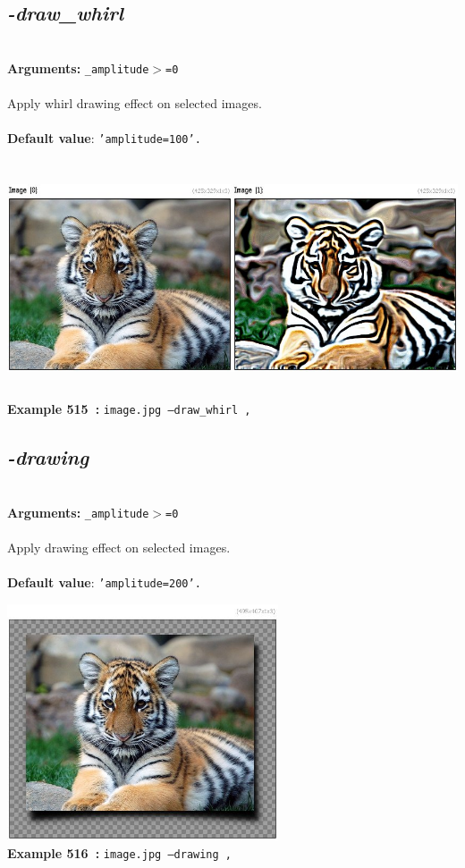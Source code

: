 \documentclass[a4paper,11pt,twoside]{book}
\begin{document}
\subsection{\emph{-draw\_whirl} }\vspace*{-0.5em}
~\\\textbf{Arguments: } 
{\small \texttt{\_amplitude$>$=0}}\\~\\
Apply whirl drawing effect on selected images.
~\\~\\\textbf{Default value}: {\small \texttt{'amplitude=100'.}}
\begin{center}\includegraphics[keepaspectratio=true,height=7cm,width=\textwidth]{img/gmic_def515.jpg}\\
{\footnotesize \textbf{Example 515~:} \texttt{image.jpg --draw\_whirl ,}}
\end{center}

\subsection{\emph{-drawing} }\vspace*{-0.5em}
~\\\textbf{Arguments: } 
{\small \texttt{\_amplitude$>$=0}}\\~\\
Apply drawing effect on selected images.
~\\~\\\textbf{Default value}: {\small \texttt{'amplitude=200'.}}
\begin{center}\includegraphics[keepaspectratio=true,height=7cm,width=\textwidth]{img/gmic_def516.jpg}\\
{\footnotesize \textbf{Example 516~:} \texttt{image.jpg --drawing ,}}
\end{center}
\end{document}
